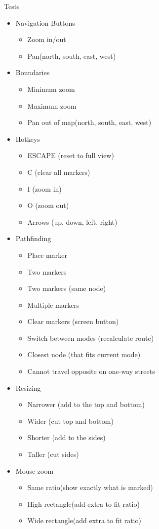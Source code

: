 Tests
\begin{itemize}
  \item Navigation Buttons
  \begin{itemize}
   \item Zoom in/out
   \item Pan(north, south, east, west)
   \end{itemize}
  \item Boundaries 
  \begin{itemize}
    \item Minimum zoom
    \item Maximum zoom
    \item Pan out of map(north, south, east, west) 
   \end{itemize}
  \item Hotkeys
  \begin{itemize}
   \item ESCAPE (reset to full view)
   \item C (clear all markers)
   \item I (zoom in)
   \item O (zoom out)
   \item Arrows (up, down, left, right)
  \end{itemize}
  \item Pathfinding 
  \begin{itemize}
   \item Place marker
   \item Two markers
   \item Two markers (same node)
   \item Multiple markers
   \item Clear markers (screen button)
   \item Switch between modes (recalculate route)
   \item Closest node (that fits current mode)
   \item Cannot travel opposite on one-way streets
  \end{itemize}
  \item Resizing 
  \begin{itemize}
   \item Narrower (add to the top and bottom)
   \item Wider (cut top and bottom)
   \item Shorter (add to the sides)
   \item Taller (cut sides)
  \end{itemize}
  \item Mouse zoom 
  \begin{itemize}
   \item Same ratio(show exactly what is marked)
   \item High rectangle(add extra to fit ratio)
   \item Wide rectangle(add extra to fit ratio)
  \end{itemize}
\end{itemize}